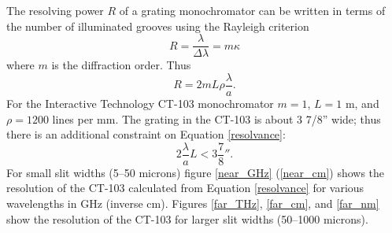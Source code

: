 The resolving power $R$ of a grating monochromator can be written in terms of the number of illuminated grooves using the Rayleigh criterion \cite{Hecht:1987a}
\begin{equation}
R
=
\frac
{\lambda}
{\Delta \lambda}
=
m \kappa
\label{Rayleigh}
\end{equation}
where $m$ is the diffraction order. Thus
\begin{equation}
\boxed{
R = 2 m L \rho \frac{\lambda}{a}.
\label{resolvance}
}
\end{equation}
For the Interactive Technology CT-103 monochromator $m=1$, $L=1$ m, and $\rho=1200$ lines per mm. The grating in the CT-103 is about 3 7/8'' wide; thus there is an additional constraint on Equation \ref{resolvance}:
\begin{equation}
2 \frac{\lambda}{a}L < 3\frac{7}{8}''.
\end{equation}
For small slit widths (5--50 microns) figure \ref{near_GHz} (\ref{near_cm}) shows the resolution of the CT-103 calculated from Equation \ref{resolvance} for various wavelengths in GHz (inverse cm). Figures \ref{far_THz}, \ref{far_cm}, and \ref{far_nm} show the resolution of the CT-103 for larger slit widths (50--1000 microns).





